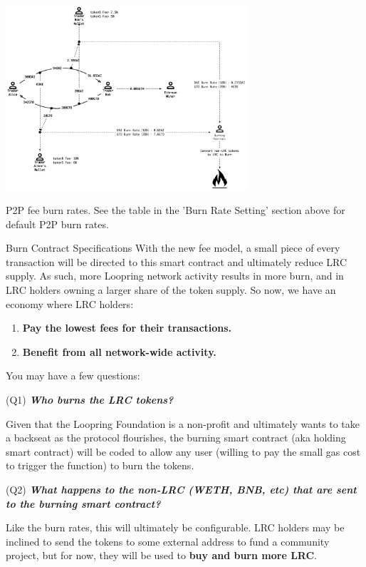 \documentclass[UTF8,nofonts]{article}
\makeatletter
\newenvironment{figurehere}
 {\def\@captype{figure}}
 {}
\makeatother
\begin{document}
\begin{multicols}{2}
\begin{appendices}
\begin{center}
\begin{figurehere}
\centering
\includegraphics[width=9cm]{5.png}
\caption{P2P fee burn rates. See the table in the 'Burn Rate Setting' section above for default P2P burn rates.}
\end{figurehere}
\end{center}

Burn Contract Specifications
With the new fee model, a small piece of every transaction will be directed to this smart contract and ultimately reduce LRC supply. As such, more Loopring network activity results in more burn, and in LRC holders owning a larger share of the token supply. So now, we have an economy where LRC holders:
\begin{enumerate}
	\item \textbf{Pay the lowest fees for their transactions.}
	\item \textbf{Benefit from all network-wide activity.}
\end{enumerate}

You may have a few questions:


(Q1) \textbf{\textit{Who burns the LRC tokens?}}


Given that the Loopring Foundation is a non-profit and ultimately wants to take a backseat as the protocol flourishes, the burning smart contract (aka holding smart contract) will be coded to allow any user (willing to pay the small gas cost to trigger the function) to burn the tokens.



(Q2) \textbf{\textit{What happens to the non-LRC (WETH, BNB, etc) that are sent to the burning smart contract?}}

Like the burn rates, this will ultimately be configurable. LRC holders may be inclined to send the tokens to some external address to fund a community project, but for now, they will be used to \textbf{buy and burn more LRC}. 


\end{appendices}
\end{multicols}
\end{document}
